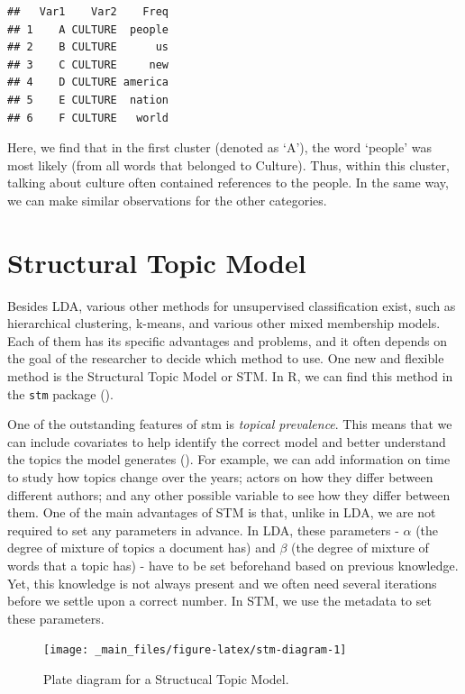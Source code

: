 \documentclass[
]{book}
\begin{document}
\begin{verbatim}
##   Var1    Var2    Freq
## 1    A CULTURE  people
## 2    B CULTURE      us
## 3    C CULTURE     new
## 4    D CULTURE america
## 5    E CULTURE  nation
## 6    F CULTURE   world
\end{verbatim}

Here, we find that in the first cluster (denoted as `A'), the word `people' was most likely (from all words that belonged to Culture). Thus, within this cluster, talking about culture often contained references to the people. In the same way, we can make similar observations for the other categories.

\section{Structural Topic Model}\label{structural-topic-model}

Besides LDA, various other methods for unsupervised classification exist, such as hierarchical clustering, k-means, and various other mixed membership models. Each of them has its specific advantages and problems, and it often depends on the goal of the researcher to decide which method to use. One new and flexible method is the Structural Topic Model or STM. In R, we can find this method in the \texttt{stm} package ().

One of the outstanding features of stm is \emph{topical prevalence}. This means that we can include covariates to help identify the correct model and better understand the topics the model generates (). For example, we can add information on time to study how topics change over the years; actors on how they differ between different authors; and any other possible variable to see how they differ between them. One of the main advantages of STM is that, unlike in LDA, we are not required to set any parameters in advance. In LDA, these parameters - \(\alpha\) (the degree of mixture of topics a document has) and \(\beta\) (the degree of mixture of words that a topic has) - have to be set beforehand based on previous knowledge. Yet, this knowledge is not always present and we often need several iterations before we settle upon a correct number. In STM, we use the metadata to set these parameters.

\hfill\break

\begin{figure}
\texttt{[image: \_main\_files/figure-latex/stm-diagram-1]} \caption{Plate diagram for a Structucal Topic Model.}\label{fig:stm-diagram}
\end{figure}
\end{document}
